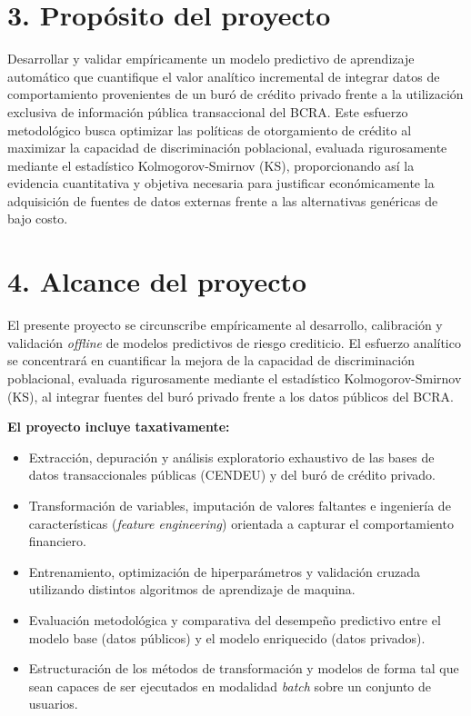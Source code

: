 \documentclass[
11pt, %
]{charter}
\begin{document}
\section{3. Propósito del proyecto}
\label{sec:proposito}

Desarrollar y validar empíricamente un modelo predictivo de aprendizaje automático que cuantifique el valor analítico incremental de integrar datos de comportamiento provenientes de un buró de crédito privado frente a la utilización exclusiva de información pública transaccional del BCRA. Este esfuerzo metodológico busca optimizar las políticas de otorgamiento de crédito al maximizar la capacidad de discriminación poblacional, evaluada rigurosamente mediante el estadístico Kolmogorov-Smirnov (KS), proporcionando así la evidencia cuantitativa y objetiva necesaria para justificar económicamente la adquisición de fuentes de datos externas frente a las alternativas genéricas de bajo costo.

\section{4. Alcance del proyecto}
\label{sec:alcance}

El presente proyecto se circunscribe empíricamente al desarrollo, calibración y validación \textit{offline} de modelos predictivos de riesgo crediticio. El esfuerzo analítico se concentrará en cuantificar la mejora de la capacidad de discriminación poblacional, evaluada rigurosamente mediante el estadístico Kolmogorov-Smirnov (KS), al integrar fuentes del buró privado frente a los datos públicos del BCRA.

\textbf{El proyecto incluye taxativamente:}
\begin{itemize}
\item Extracción, depuración y análisis exploratorio exhaustivo de las bases de datos transaccionales públicas (CENDEU) y del buró de crédito privado.
\item Transformación de variables, imputación de valores faltantes e ingeniería de características (\textit{feature engineering}) orientada a capturar el comportamiento financiero.
\item Entrenamiento, optimización de hiperparámetros y validación cruzada utilizando distintos algoritmos de aprendizaje de maquina.
\item Evaluación metodológica y comparativa del desempeño predictivo entre el modelo base (datos públicos) y el modelo enriquecido (datos privados).
\item Estructuración de los métodos de transformación y modelos de forma tal que sean capaces de ser ejecutados en modalidad \textit{batch} sobre un conjunto de usuarios.
\end{itemize}
\end{document}
